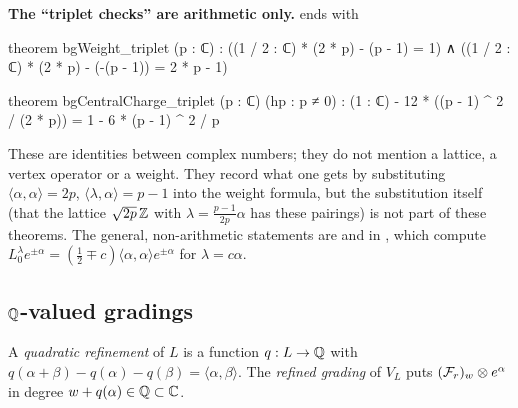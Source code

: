 \begin{warning}
\textbf{The ``triplet checks'' are arithmetic only.}  ends with
\begin{leancode}
theorem bgWeight_triplet (p : ℂ) :
    ((1 / 2 : ℂ) * (2 * p) - (p - 1) = 1) ∧
      ((1 / 2 : ℂ) * (2 * p) - (-(p - 1)) = 2 * p - 1)

theorem bgCentralCharge_triplet (p : ℂ) (hp : p ≠ 0) :
    (1 : ℂ) - 12 * ((p - 1) ^ 2 / (2 * p)) = 1 - 6 * (p - 1) ^ 2 / p
\end{leancode}
These are identities between complex numbers; they do not mention a lattice, a vertex operator or a weight. They
record what one gets by substituting $\langle\alpha,\alpha\rangle=2p$, $\langle\lambda,\alpha\rangle=p-1$ into the weight
formula, but the substitution itself (that the lattice $\sqrt{2p}\,{\mathbb{Z}}$ with $\lambda=\frac{p-1}{2p}\alpha$ has these pairings)
is not part of these theorems. The general, non-arithmetic statements are  and
 in , which compute
$L^\lambda_0e^{\pm\alpha}=(\frac12\mp c)\langle\alpha,\alpha\rangle e^{\pm\alpha}$ for $\lambda=c\alpha$.
\end{warning}

\subsection{\texorpdfstring{${\mathbb{Q}}$}{Q}-valued gradings}

\begin{definition}\label{l05:def:quadrefine}
A \emph{quadratic refinement} of $L$ is a function $q:L\to{\mathbb{Q}}$ with $q(\alpha+\beta)-q(\alpha)-q(\beta)=\langle\alpha,\beta\rangle$.
The \emph{refined grading} of $V_L$ puts $(\mathcal{F}_r)_w\otimes e^\alpha$ in degree $w+q(\alpha)\in{\mathbb{Q}}\subset{\mathbb{C}}$.
\end{definition}

